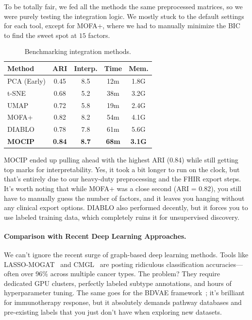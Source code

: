 \documentclass[runningheads]{llncs}
\begin{document}
To be totally fair, we fed all the methods the same preprocessed matrices, so we were purely testing the integration logic. We mostly stuck to the default settings for each tool, except for MOFA+, where we had to manually minimize the BIC to find the sweet spot at $15$ factors.

\begin{table}[H]
\caption{Benchmarking integration methods.}\label{tab:benchmark}
\centering
\scriptsize
\setlength{\tabcolsep}{2pt}
\begin{tabular}{l c c c c}
\toprule
\textbf{Method} & \textbf{ARI} & \textbf{Interp.} & \textbf{Time} & \textbf{Mem.} \\
\midrule
PCA (Early)      & 0.45 & 8.5 & 12m & 1.8G \\
t-SNE            & 0.68 & 5.2 & 38m & 3.2G \\
UMAP             & 0.72 & 5.8 & 19m & 2.4G \\
MOFA+            & 0.82 & 8.2 & 54m & 4.1G \\
DIABLO           & 0.78 & 7.8 & 61m & 5.6G \\
\midrule
\textbf{MOCIP}   & \textbf{0.84} & \textbf{8.7} & \textbf{68m} & \textbf{3.1G} \\
\bottomrule
\end{tabular}
\end{table}

MOCIP ended up pulling ahead with the highest ARI (0.84) while still getting top marks for interpretability. Yes, it took a bit longer to run on the clock, but that's entirely due to our heavy-duty preprocessing and the FHIR export steps. It's worth noting that while MOFA+ was a close second (ARI = 0.82), you still have to manually guess the number of factors, and it leaves you hanging without any clinical export options. DIABLO also performed decently, but it forces you to use labeled training data, which completely ruins it for unsupervised discovery.

\paragraph{Comparison with Recent Deep Learning Approaches.}
We can't ignore the recent surge of graph-based deep learning methods. Tools like LASSO-MOGAT~\cite{alharbi2024lassomogat} and CMGL~\cite{fan2026cmgl} are posting ridiculous classification accuracies---often over 96\% across multiple cancer types. The problem? They require dedicated GPU clusters, perfectly labeled subtype annotations, and hours of hyperparameter tuning. The same goes for the BDVAE framework~\cite{tariq2025bdvae}; it's brilliant for immunotherapy response, but it absolutely demands pathway databases and pre-existing labels that you just don't have when exploring new datasets.
\end{document}
